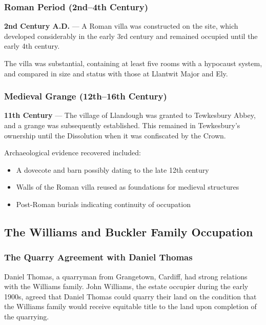 \documentclass[11pt,a4paper]{article}
\begin{document}
\subsubsection{Roman Period (2nd--4th Century)}

\begin{timeline}
\textbf{2nd Century A.D.} --- A Roman villa was constructed on the site, which developed considerably in the early 3rd century and remained occupied until the early 4th century.
\end{timeline}

The villa was substantial, containing at least five rooms with a hypocaust system, and compared in size and status with those at Llantwit Major and Ely.

\subsubsection{Medieval Grange (12th--16th Century)}

\begin{timeline}
\textbf{11th Century} --- The village of Llandough was granted to Tewkesbury Abbey, and a grange was subsequently established. This remained in Tewkesbury's ownership until the Dissolution when it was confiscated by the Crown.
\end{timeline}

Archaeological evidence recovered included:
\begin{itemize}
    \item A dovecote and barn possibly dating to the late 12th century
    \item Walls of the Roman villa reused as foundations for medieval structures
    \item Post-Roman burials indicating continuity of occupation
\end{itemize}

\subsection{The Williams and Buckler Family Occupation}

\subsubsection{The Quarry Agreement with Daniel Thomas}

\begin{keyfact}
Daniel Thomas, a quarryman from Grangetown, Cardiff, had strong relations with the Williams family. John Williams, the estate occupier during the early 1900s, agreed that Daniel Thomas could quarry their land on the condition that the Williams family would receive equitable title to the land upon completion of the quarrying.
\end{keyfact}
\end{document}
